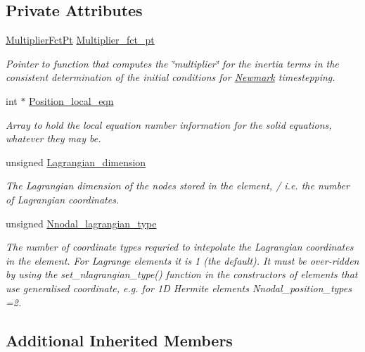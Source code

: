 \subsection*{Private Attributes}
\begin{DoxyCompactItemize}
\item 
\hyperlink{classoomph_1_1SolidFiniteElement_a1ec1cdf98041a51f77aab2b892856fc4}{Multiplier\+Fct\+Pt} \hyperlink{classoomph_1_1SolidFiniteElement_ad93b1496c6d963fd7f7b28d0e78bcbff}{Multiplier\+\_\+fct\+\_\+pt}
\begin{DoxyCompactList}\small\item\em Pointer to function that computes the \char`\"{}multiplier\char`\"{} for the inertia terms in the consistent determination of the initial conditions for \hyperlink{classoomph_1_1Newmark}{Newmark} timestepping. \end{DoxyCompactList}\item 
int $\ast$ \hyperlink{classoomph_1_1SolidFiniteElement_a32e61585f928d3cec6d61033a971776e}{Position\+\_\+local\+\_\+eqn}
\begin{DoxyCompactList}\small\item\em Array to hold the local equation number information for the solid equations, whatever they may be. \end{DoxyCompactList}\item 
unsigned \hyperlink{classoomph_1_1SolidFiniteElement_a4c2267355f097b864f9994f965ad8305}{Lagrangian\+\_\+dimension}
\begin{DoxyCompactList}\small\item\em The Lagrangian dimension of the nodes stored in the element, / i.\+e. the number of Lagrangian coordinates. \end{DoxyCompactList}\item 
unsigned \hyperlink{classoomph_1_1SolidFiniteElement_a82f45b63fe051fc87deae77c6e6106e6}{Nnodal\+\_\+lagrangian\+\_\+type}
\begin{DoxyCompactList}\small\item\em The number of coordinate types requried to intepolate the Lagrangian coordinates in the element. For Lagrange elements it is 1 (the default). It must be over-\/ridden by using the set\+\_\+nlagrangian\+\_\+type() function in the constructors of elements that use generalised coordinate, e.\+g. for 1D Hermite elements Nnodal\+\_\+position\+\_\+types =2. \end{DoxyCompactList}\end{DoxyCompactItemize}
\subsection*{Additional Inherited Members}


